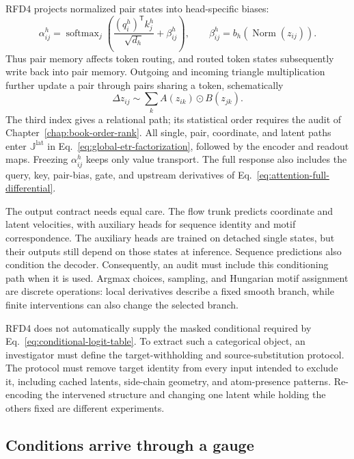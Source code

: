 RFD4 projects normalized pair states into head-specific biases:
\begin{equation}
\alpha_{ij}^{h}
=\operatorname{softmax}_{j}\!\left(
\frac{(q_i^h)^{\mathsf T}k_j^h}{\sqrt{d_h}}+\beta_{ij}^{h}\right),
\qquad
\beta_{ij}^{h}=b_h\!\left(\operatorname{Norm}(z_{ij})\right).
\label{eq:rfd4-pair-route}
\end{equation}
Thus pair memory affects token routing, and routed token states subsequently write back into pair
memory.  Outgoing and incoming triangle multiplication further update a pair through pairs sharing
a token, schematically
\begin{equation}
\Delta z_{ij}
\sim\sum_k A(z_{ik})\odot B(z_{jk}).
\label{eq:rfd4-triangle-path}
\end{equation}
The third index gives a relational path; its statistical order requires the audit of
Chapter~\ref{chap:book-order-rank}.  All single, pair, coordinate, and latent paths enter
$\mathbb J^{\mathrm{lat}}$ in Eq.~\ref{eq:global-etr-factorization}, followed by the encoder
and readout maps.  Freezing $\alpha_{ij}^h$ keeps only value transport.  The full response also
includes the query, key, pair-bias, gate, and upstream derivatives of
Eq.~\ref{eq:attention-full-differential}.

The output contract needs equal care.  The flow trunk predicts coordinate and latent velocities,
with auxiliary heads for sequence identity and motif correspondence.  The auxiliary heads are
trained on detached single states, but their outputs still depend on those states at inference.
Sequence predictions also condition the decoder.  Consequently, an audit must include this
conditioning path when it is used.  Argmax choices, sampling, and Hungarian motif assignment
are discrete operations: local derivatives describe a fixed smooth branch, while finite
interventions can also change the selected branch.

RFD4 does not automatically supply the masked conditional required by
Eq.~\ref{eq:conditional-logit-table}.  To extract such a categorical object, an investigator must
define the target-withholding and source-substitution protocol.  The protocol must remove target
identity from every input intended to exclude it, including cached latents, side-chain geometry,
and atom-presence patterns.  Re-encoding the intervened structure and changing one latent while
holding the others fixed are different experiments.

\subsection{Conditions arrive through a gauge}

